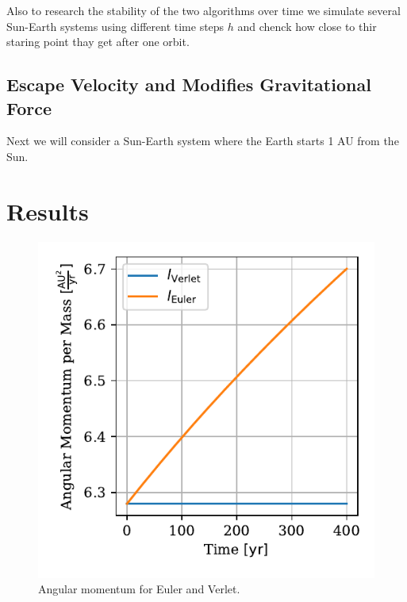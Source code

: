 \documentclass[twocolumn]{aastex62}
\begin{document}
Also to research the stability of the two algorithms over
time we simulate several Sun-Earth systems using different time steps $h$ and
chenck how close to thir staring point thay get after one orbit. 

\subsection{Escape Velocity and Modifies Gravitational Force}
Next we will consider a Sun-Earth system where the Earth starts 1 AU from the
Sun.


\section{Results} \label{sec:results}
\begin{figure}
\includegraphics[scale=1]{Figures/taskb_angmom.pdf}
\caption{Angular momentum for Euler and Verlet.}
\label{fig:angmom}
\end{figure}
\end{document}
